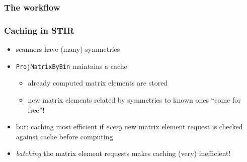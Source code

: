 \documentclass{beamer}
\begin{document}
\begin{frame}
  \frametitle{The workflow}
  \begin{figure}
    \centering
  \end{figure}
\end{frame}

\begin{frame}
  \frametitle{Caching in STIR}
  \begin{itemize}
  \item scanners have (many) symmetries
  \item \texttt{ProjMatrixByBin} maintains a cache
    \begin{itemize}
    \item already computed matrix elements are stored
    \item new matrix elements related by symmetries to known ones ``come for free''!
    \end{itemize}
    \pause
  \item but: caching most efficient if \textsl{every} new matrix element request is checked against cache before computing
  \item \textsl{batching} the matrix element requests makes caching (very) inefficient!
  \end{itemize}
\end{frame}
\end{document}
